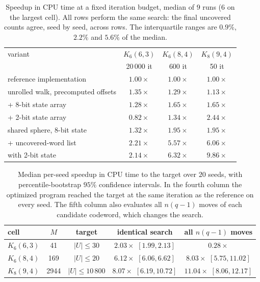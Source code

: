 \documentclass[11pt]{amsart}
\newcommand{\Kq}[3]{K_{#1}(#2,#3)}
\begin{document}
\begin{table}[ht]
\centering
\begin{tabular}{lccc}
\toprule
variant & $\Kq{6}{6}{3}$ & $\Kq{6}{8}{4}$ & $\Kq{8}{9}{4}$ \\
        & 20\,000 it & 600 it & 50 it \\
\midrule
reference implementation      & $1.00\times$ & $1.00\times$ & $1.00\times$ \\
unrolled walk, precomputed offsets  & $1.35\times$ & $1.29\times$ & $1.13\times$ \\
\quad + 8-bit state array     & $1.28\times$ & $1.65\times$ & $1.65\times$ \\
\quad + 2-bit state array     & $0.82\times$ & $1.34\times$ & $2.44\times$ \\
shared sphere, 8-bit state    & $1.32\times$ & $1.95\times$ & $1.95\times$ \\
\quad + uncovered-word list   & $2.21\times$ & $5.57\times$ & $6.06\times$ \\
\quad with 2-bit state        & $2.14\times$ & $\mathbf{6.32\times}$ & $\mathbf{9.86\times}$ \\
\bottomrule
\end{tabular}
\caption{Speedup in CPU time at a fixed iteration budget, median of $9$
runs ($6$ on the largest cell). All rows perform the same search: the
final uncovered counts agree, seed by seed, across rows. The interquartile
ranges are $0.9\%$, $2.2\%$ and $5.6\%$ of the median.}
\label{tab:engfixed}
\end{table}

\begin{table}[ht]
\centering
\begin{tabular}{lcccc}
\toprule
cell & $M$ & target & identical search & all $n(q-1)$ moves \\
\midrule
$\Kq{6}{6}{3}$ & 41   & $|U|\le 30$      & $2.03\times$ $[1.99,2.13]$ & $0.28\times$ \\
$\Kq{6}{8}{4}$ & 169  & $|U|\le 20$      & $6.12\times$ $[6.06,6.62]$ & $8.03\times$ $[5.75,11.02]$ \\
$\Kq{8}{9}{4}$ & 2944 & $|U|\le 10\,800$ & $8.07\times$ $[6.19,10.72]$ & $11.04\times$ $[8.06,12.17]$ \\
\bottomrule
\end{tabular}
\caption{Median per-seed speedup in CPU time to the target over $20$
seeds, with percentile-bootstrap $95\%$ confidence intervals. In the
fourth column the optimized program reached the target at the same
iteration as the reference on every seed. The fifth column also evaluates
all $n(q-1)$ moves of each candidate codeword, which changes the search.}
\label{tab:engttt}
\end{table}
\end{document}
